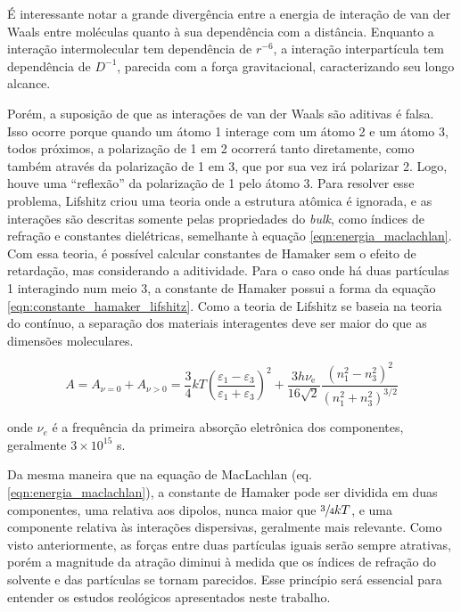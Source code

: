 	É interessante notar a grande divergência entre a energia de interação de van der Waals entre moléculas quanto à sua dependência com a distância. Enquanto a interação intermolecular tem dependência de \(r^{-6}\), a interação interpartícula tem dependência de \(D^{-1}\), parecida com a força gravitacional, caracterizando seu longo alcance.
	
	Porém, a suposição de que as interações de van der Waals são aditivas é falsa. Isso ocorre porque quando um átomo 1 interage com um átomo 2 e um átomo 3, todos próximos, a polarização de 1 em 2 ocorrerá tanto diretamente, como também através da polarização de 1 em 3, que por sua vez irá polarizar 2. Logo, houve uma ``reflexão'' da polarização de 1 pelo átomo 3. Para resolver esse problema, Lifshitz criou uma teoria onde a estrutura atômica é ignorada, e as interações são descritas somente pelas propriedades do \emph{bulk}, como índices de refração e constantes dielétricas, semelhante à equação \ref{eqn:energia_maclachlan}. Com essa teoria, é possível calcular constantes de Hamaker sem o efeito de retardação, mas considerando a aditividade. Para o caso onde há duas partículas 1 interagindo num meio 3, a constante de Hamaker possui a forma da equação \ref{eqn:constante_hamaker_lifshitz}. Como a teoria de Lifshitz se baseia na teoria do contínuo, a separação dos materiais interagentes deve ser maior do que as dimensões moleculares.
	
	\begin{equation}
	A = A_{\nu=0} + A_{\nu>0}  = \frac{3}{4} kT \left( \frac { \varepsilon_{1}-\varepsilon_{3}} { \varepsilon_{1} + \varepsilon_{3} } \right)^{2} + \frac{3h\nu_{\mathrm{e} } } {16\sqrt{2}} \frac{\left(n_{1}^{2} - n_{3}^{2} \right)^{2}} {\left(n_{1}^{2} + n_{3}^{2} \right)^{3/2} }
	\label{eqn:constante_hamaker_lifshitz}
	\end{equation}
	
	\noindent onde \(\nu_e\) é a frequência da primeira absorção eletrônica dos componentes, geralmente \(3 \times 10^{15}\) s\menosUm.
	
	Da mesma maneira que na equação de MacLachlan (eq. \ref{eqn:energia_maclachlan}), a constante de Hamaker pode ser dividida em duas componentes, uma relativa aos dipolos, nunca maior que \(\sfrac{3}{4}kT\), e uma componente relativa às interações dispersivas, geralmente mais relevante. Como visto anteriormente, as forças entre duas partículas iguais serão sempre atrativas, porém a magnitude da atração diminui à medida que os índices de refração do solvente e das partículas se tornam parecidos. Esse princípio será essencial para entender os estudos reológicos apresentados neste trabalho.
	
